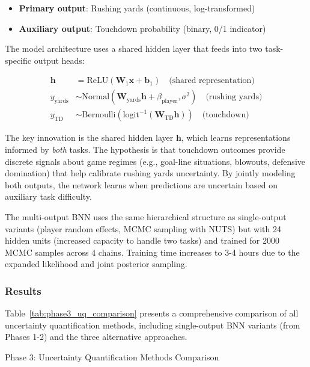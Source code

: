 \begin{itemize}
    \item \textbf{Primary output}: Rushing yards (continuous, log-transformed)
    \item \textbf{Auxiliary output}: Touchdown probability (binary, 0/1 indicator)
\end{itemize}

The model architecture uses a shared hidden layer that feeds into two task-specific output heads:

\begin{align}
    \mathbf{h} &= \text{ReLU}(\mathbf{W}_1 \mathbf{x} + \mathbf{b}_1) \quad \text{(shared representation)} \\
    y_{\text{yards}} &\sim \text{Normal}(\mathbf{W}_{\text{yards}} \mathbf{h} + \beta_{\text{player}}, \sigma^2) \quad \text{(rushing yards)} \\
    y_{\text{TD}} &\sim \text{Bernoulli}(\text{logit}^{-1}(\mathbf{W}_{\text{TD}} \mathbf{h})) \quad \text{(touchdown)}
\end{align}

The key innovation is the shared hidden layer $\mathbf{h}$, which learns representations informed by \textit{both} tasks. The hypothesis is that touchdown outcomes provide discrete signals about game regimes (e.g., goal-line situations, blowouts, defensive domination) that help calibrate rushing yards uncertainty. By jointly modeling both outputs, the network learns when predictions are uncertain based on auxiliary task difficulty.

The multi-output BNN uses the same hierarchical structure as single-output variants (player random effects, MCMC sampling with NUTS) but with 24 hidden units (increased capacity to handle two tasks) and trained for 2000 MCMC samples across 4 chains. Training time increases to 3-4 hours due to the expanded likelihood and joint posterior sampling.

\subsubsection{Results}

Table~\ref{tab:phase3_uq_comparison} presents a comprehensive comparison of all uncertainty quantification methods, including single-output BNN variants (from Phases 1-2) and the three alternative approaches.

\begin{table}[t]
  \centering
  \caption{Phase 3: Uncertainty Quantification Methods Comparison}
  \label{tab:phase3_uq_comparison}
  
\end{table}

